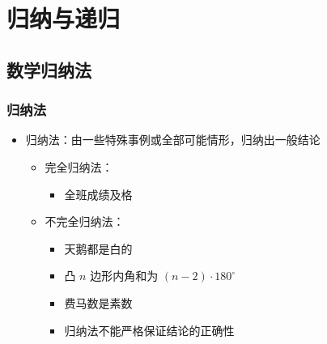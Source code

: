 \documentclass[UTF8]{report}
\theoremstyle{MyLineTheoremStyle} %
\theoremstyle{MyBlockTheoremStyle} %
\theoremstyle{MySubsubsectionStyle} %
\begin{document}
\chapter{归纳与递归}

\section{数学归纳法}

\subsection{归纳法}
\begin{itemize}
    \item 归纳法：由一些特殊事例或全部可能情形，归纳出一般结论
    \begin{itemize}
        \item 完全归纳法：
        \begin{itemize}
            \item 全班成绩及格
        \end{itemize}
        \item 不完全归纳法：
        \begin{itemize}
            \item 天鹅都是白的
            \item 凸 $n$ 边形内角和为 $(n - 2) \cdot 180^\circ$
            \item 费马数是素数
            \item 归纳法不能严格保证结论的正确性
        \end{itemize}
    \end{itemize}
\end{itemize}
\end{document}
